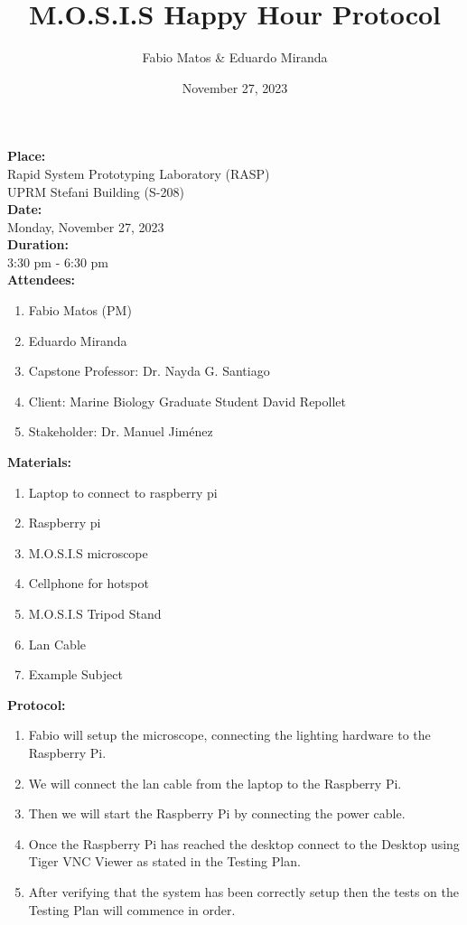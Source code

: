 \documentclass[12pt]{article}
\title{M.O.S.I.S Happy Hour Protocol}
\author{Fabio Matos \& Eduardo Miranda}
\date{November 27, 2023}
\begin{document}
\maketitle
\noindent
\textbf{Place:} \\
Rapid System Prototyping Laboratory (RASP)\\ UPRM Stefani Building (S-208)\\
\textbf{Date:}\\
Monday, November 27, 2023\\
\textbf{Duration:}\\
3:30 pm - 6:30 pm \\
\textbf{Attendees:}
\begin{enumerate}
    \item Fabio Matos (PM)
    \item Eduardo Miranda
    \item Capstone Professor: Dr. Nayda G. Santiago
    \item Client: Marine Biology Graduate Student David Repollet
    \item Stakeholder: Dr. Manuel Jiménez
\end{enumerate}
\textbf{Materials:}
\begin{enumerate}
    \item Laptop to connect to raspberry pi
    \item Raspberry pi
    \item M.O.S.I.S microscope
    \item Cellphone for hotspot
    \item M.O.S.I.S Tripod Stand
    \item Lan Cable
    \item Example Subject
\end{enumerate}

\textbf{Protocol:}
\begin{enumerate}
    \item Fabio will setup the microscope, connecting the lighting hardware to the Raspberry Pi.
    \item We will connect the lan cable from the laptop to the Raspberry Pi.
    \item Then we will start the Raspberry Pi by connecting the power cable.
    \item Once the Raspberry Pi has reached the desktop connect to the Desktop using Tiger VNC Viewer as stated in the Testing Plan.
    \item After verifying that the system has been correctly setup then the tests on the Testing Plan will commence in order.
\end{enumerate}
\end{document}

